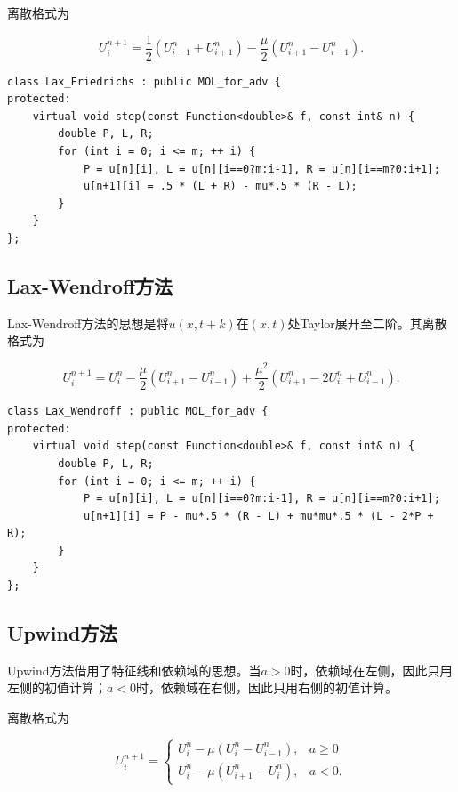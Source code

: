 \documentclass{ctexart}
\begin{document}
离散格式为

\begin{equation}
	U^{n+1}_i = \dfrac 12(U^n_{i-1}+U^n_{i+1}) - \dfrac {\mu}2(U^n_{i+1} - U^n_{i-1}).
\end{equation}

\begin{lstlisting}
class Lax_Friedrichs : public MOL_for_adv {
protected:
	virtual void step(const Function<double>& f, const int& n) {
		double P, L, R;
		for (int i = 0; i <= m; ++ i) {
			P = u[n][i], L = u[n][i==0?m:i-1], R = u[n][i==m?0:i+1];
			u[n+1][i] = .5 * (L + R) - mu*.5 * (R - L);
		}
	}
};
\end{lstlisting}

\subsection{Lax-Wendroff方法}

Lax-Wendroff方法的思想是将$u(x,t+k)$在$(x,t)$处Taylor展开至二阶。其离散格式为

\begin{equation}
	U^{n+1}_i = U^n_i - \dfrac {\mu}2(U^n_{i+1} - U^n_{i-1}) +\dfrac {\mu^2}2(U^n_{i+1} - 2U^n_i + U^n_{i-1}).
\end{equation}

\begin{lstlisting}
class Lax_Wendroff : public MOL_for_adv {
protected:
	virtual void step(const Function<double>& f, const int& n) {
		double P, L, R;
		for (int i = 0; i <= m; ++ i) {
			P = u[n][i], L = u[n][i==0?m:i-1], R = u[n][i==m?0:i+1];
			u[n+1][i] = P - mu*.5 * (R - L) + mu*mu*.5 * (L - 2*P + R);
		}
	}
};
\end{lstlisting}

\subsection{Upwind方法}

Upwind方法借用了特征线和依赖域的思想。当$a>0$时，依赖域在左侧，因此只用左侧的初值计算；$a<0$时，依赖域在右侧，因此只用右侧的初值计算。

离散格式为

\begin{equation}
U^{n+1}_i = \left\{
\begin{aligned}
	U^n_i - \mu(U^n_i - U^n_{i-1}), & a\geq 0\\
	U^n_i - \mu(U^n_{i+1} - U^n_i), & a < 0.
\end{aligned}
\right.
\end{equation}
\end{document}
